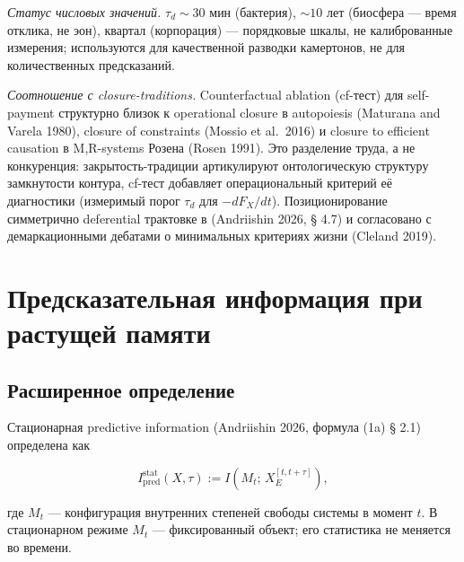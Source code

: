 \documentclass[pdflatex,sn-mathphys-ay]{sn-jnl}
\begin{document}
\emph{Статус числовых значений.} \(\tau_d \sim 30\) мин (бактерия), \(\sim 10\) лет (биосфера --- время отклика, не эон), квартал (корпорация) --- порядковые шкалы, не калиброванные измерения; используются для качественной разводки камертонов, не для количественных предсказаний.



\emph{Соотношение с closure-traditions.} Counterfactual ablation (cf-тест) для self-payment структурно близок к operational closure в autopoiesis (Maturana and Varela 1980), closure of constraints (Mossio et al.~2016) и closure to efficient causation в M,R-systems Розена (Rosen 1991). Это разделение труда, а не конкуренция: закрытость-традиции артикулируют онтологическую структуру замкнутости контура, cf-тест добавляет операциональный критерий её диагностики (измеримый порог \(\tau_d\) для \(-dF_X/dt\)). Позиционирование симметрично deferential трактовке в (Andriishin 2026, § 4.7) и согласовано с демаркационными дебатами о минимальных критериях жизни (Cleland 2019).



\section{Предсказательная информация при растущей памяти}\label{ux43fux440ux435ux434ux441ux43aux430ux437ux430ux442ux435ux43bux44cux43dux430ux44f-ux438ux43dux444ux43eux440ux43cux430ux446ux438ux44f-ux43fux440ux438-ux440ux430ux441ux442ux443ux449ux435ux439-ux43fux430ux43cux44fux442ux438}



\subsection{Расширенное определение}\label{ux440ux430ux441ux448ux438ux440ux435ux43dux43dux43eux435-ux43eux43fux440ux435ux434ux435ux43bux435ux43dux438ux435}



Стационарная predictive information (Andriishin 2026, формула (1a) § 2.1) определена как



\[I_{\text{pred}}^{\text{stat}}(X, \tau) := I\!\left(M_t;\, X_E^{[t, t+\tau]}\right),\]



где \(M_t\) --- конфигурация внутренних степеней свободы системы в момент \(t\). В стационарном режиме \(M_t\) --- фиксированный объект; его статистика не меняется во времени.
\end{document}
